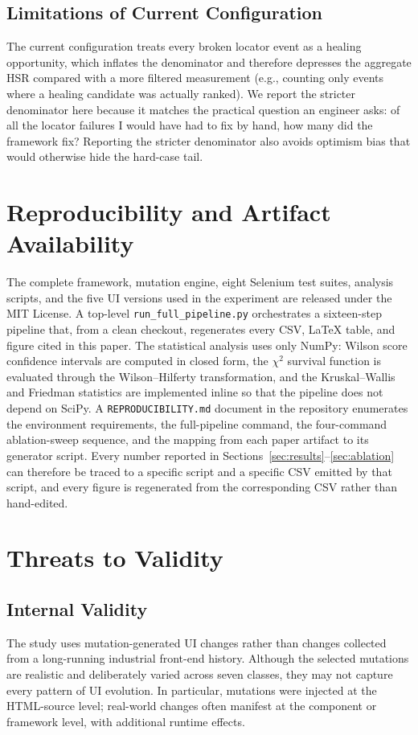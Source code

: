 \documentclass[conference]{IEEEtran}
\begin{document}
\subsection{Limitations of Current Configuration}
The current configuration treats every broken locator event as a healing opportunity, which inflates the denominator and therefore depresses the aggregate HSR compared with a more filtered measurement (e.g., counting only events where a healing candidate was actually ranked). We report the stricter denominator here because it matches the practical question an engineer asks: of all the locator failures I would have had to fix by hand, how many did the framework fix? Reporting the stricter denominator also avoids optimism bias that would otherwise hide the hard-case tail.

\section{Reproducibility and Artifact Availability}
\label{sec:reproducibility}
The complete framework, mutation engine, eight Selenium test suites, analysis scripts, and the five UI versions used in the experiment are released under the MIT License. A top-level \texttt{run\_full\_pipeline.py} orchestrates a sixteen-step pipeline that, from a clean checkout, regenerates every CSV, LaTeX table, and figure cited in this paper. The statistical analysis uses only NumPy: Wilson score confidence intervals are computed in closed form, the $\chi^{2}$ survival function is evaluated through the Wilson--Hilferty transformation, and the Kruskal--Wallis and Friedman statistics are implemented inline so that the pipeline does not depend on SciPy. A \texttt{REPRODUCIBILITY.md} document in the repository enumerates the environment requirements, the full-pipeline command, the four-command ablation-sweep sequence, and the mapping from each paper artifact to its generator script. Every number reported in Sections~\ref{sec:results}--\ref{sec:ablation} can therefore be traced to a specific script and a specific CSV emitted by that script, and every figure is regenerated from the corresponding CSV rather than hand-edited.

\section{Threats to Validity}
\label{sec:validity}

\subsection{Internal Validity}
The study uses mutation-generated UI changes rather than changes collected from a long-running industrial front-end history. Although the selected mutations are realistic and deliberately varied across seven classes, they may not capture every pattern of UI evolution. In particular, mutations were injected at the HTML-source level; real-world changes often manifest at the component or framework level, with additional runtime effects.
\end{document}
